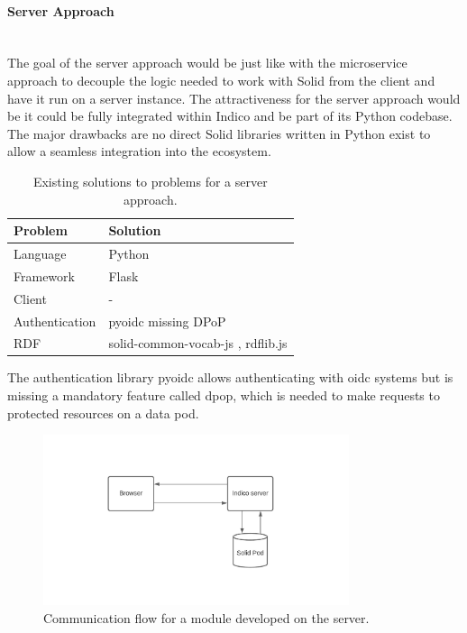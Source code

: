 \paragraph{Server Approach}\mbox{}\\

The goal of the server approach would be just like with the microservice approach to decouple the logic needed to work with Solid from the client and have it run on a server instance. The attractiveness for the server approach would be it could be fully integrated within Indico and be part of its Python codebase. The major drawbacks are no direct Solid libraries written in Python exist to allow a seamless integration into the ecosystem.

\begin{table}[!ht]
    \centering
    \begin{tabular}{| l | l |} 
    \hline
     Problem & Solution \\
     \hline
      Language & Python  \\
      Framework & Flask  \\
      Client & -  \\
      Authentication & pyoidc \cite{pyoidc} missing DPoP\\
      RDF & solid-common-vocab-js \cite{solid-common-vocab-js}, rdflib.js \cite{rdflib.js}  \\
    \hline
    \end{tabular}
    \vspace{0.75cm}
    \caption{Existing solutions to problems for a server approach.}
    \label{table:3}
\end{table}

The authentication library pyoidc allows authenticating with \gls{oidc} systems but is missing a mandatory feature called \gls{dpop}, which is needed to make requests to protected resources on a data pod.

\begin{figure}
    \centering
    \includegraphics[width=0.8\textwidth]{prototype/graphs/poc-infrastructure-backend.jpeg}
    \caption{Communication flow for a module developed on the server.}
    \label{fig:poc-infrastructure-backend}
\end{figure}
\vspace{0.5cm}
